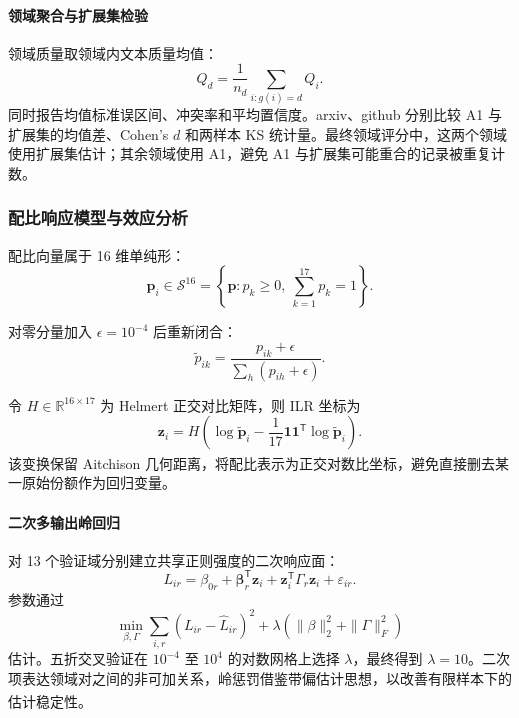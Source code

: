 \documentclass[bwprint]{gmcmthesis}
\numberwithin{equation}{section}
\numberwithin{figure}{section}
\numberwithin{table}{section}
\begin{document}
        
        \paragraph{领域聚合与扩展集检验}
        领域质量取领域内文本质量均值：
        \begin{equation}
        Q_d=\frac1{n_d}\sum_{i:g(i)=d}Q_i.
        \label{eq:domainq}
        \end{equation}
        同时报告均值标准误区间、冲突率和平均置信度。arxiv、github 分别比较 A1 与扩展集的均值差、Cohen's $d$ 和两样本 KS 统计量。最终领域评分中，这两个领域使用扩展集估计；其余领域使用 A1，避免 A1 与扩展集可能重合的记录被重复计数。
        
        
        \subsubsection{配比响应模型与效应分析}
        配比向量属于 16 维单纯形：
        \begin{equation}
        \bm p_i\in\mathcal S^{16}=\left\{\bm p:p_k\ge0,\ \sum_{k=1}^{17}p_k=1\right\}.
        \label{eq:simplex}
        \end{equation}
        
        对零分量加入 $\epsilon=10^{-4}$ 后重新闭合：
        \begin{equation}
        \widetilde p_{ik}=\frac{p_{ik}+\epsilon}{\sum_h(p_{ih}+\epsilon)}.
        \label{eq:closure}
        \end{equation}
        
        令 $H\in\mathbb R^{16\times17}$ 为 Helmert 正交对比矩阵，则 ILR 坐标为
        \begin{equation}
        \bm z_i=H\left(\log\widetilde{\bm p}_i-
        \frac1{17}\bm 1\bm 1^{\mathsf T}\log\widetilde{\bm p}_i\right).
        \label{eq:ilr}
        \end{equation}
        该变换保留 Aitchison 几何距离，将配比表示为正交对数比坐标\textsuperscript{\cite{egozcue2003ilr}}，避免直接删去某一原始份额作为回归变量。

        
        \paragraph{二次多输出岭回归}
        对 13 个验证域分别建立共享正则强度的二次响应面：
        \begin{equation}
        L_{ir}=\beta_{0r}+\bm\beta_r^{\mathsf T}\bm z_i
        +\bm z_i^{\mathsf T}\Gamma_r\bm z_i+\varepsilon_{ir}.
        \label{eq:ridge}
        \end{equation}
        参数通过
        \begin{equation}
        \min_{\beta,\Gamma}\sum_{i,r}(L_{ir}-\widehat L_{ir})^2
        +\lambda\left(\|\beta\|_2^2+\|\Gamma\|_F^2\right)
        \label{eq:ridgeobjective}
        \end{equation}
        估计。五折交叉验证在 $10^{-4}$ 至 $10^4$ 的对数网格上选择 $\lambda$，最终得到 $\lambda=10$。二次项表达领域对之间的非可加关系，岭惩罚借鉴带偏估计思想，以改善有限样本下的估计稳定性\textsuperscript{\cite{hoerl1970ridge}}。
\end{document}
